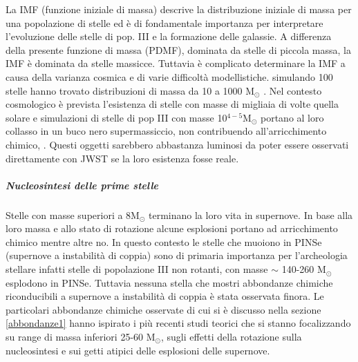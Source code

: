 \documentclass[12pt]{article}
\begin{document}
La IMF (funzione iniziale di massa) descrive la distribuzione iniziale di massa per una popolazione di stelle ed è di fondamentale importanza per interpretare l’evoluzione delle stelle di pop. III e la formazione delle galassie. A differenza della presente funzione di massa (PDMF), dominata da stelle di piccola massa, la IMF è dominata da stelle massicce. Tuttavia è complicato determinare la IMF a causa della varianza cosmica e di varie difficoltà modellistiche. \cite{Hirano_2014} simulando 100 stelle hanno trovato distribuzioni di massa da 10 a 1000 M$_{\odot}$ . 
Nel contesto cosmologico è prevista l’esistenza di stelle con masse di migliaia di volte quella solare e simulazioni di stelle di pop III con masse 10$^{4-5}$M$_{\odot}$ portano al loro collasso in un buco nero supermassiccio, non contribuendo all’arricchimento chimico, \cite{Hosokawa_2013}. Questi oggetti sarebbero abbastanza luminosi da poter essere osservati direttamente con JWST se la loro esistenza fosse reale. 

\subparagraph{Nucleosintesi delle prime stelle}

Stelle con masse superiori a 8M$_{\odot}$ terminano la loro vita in supernove. In base alla  loro massa e allo stato di rotazione alcune esplosioni portano ad arricchimento chimico mentre altre no. In questo contesto le stelle che muoiono in PINSe (supernove a instabilità di coppia) sono di primaria importanza per l’archeologia stellare infatti stelle di popolazione III non rotanti, con masse $\sim$ 140-260 M$_{\odot}$ esplodono in PINSe. Tuttavia nessuna stella che mostri abbondanze chimiche riconducibili a supernove a instabilità di coppia è stata osservata finora. Le particolari abbondanze chimiche osservate di cui si è discusso nella sezione \ref{abbondanze1} hanno ispirato i più recenti studi teorici che si stanno focalizzando su range di massa inferiori 25-60 M$_{\odot}$, sugli effetti della rotazione sulla nucleosintesi e sui getti atipici delle esplosioni delle supernove. 
\end{document}
